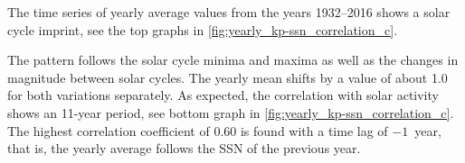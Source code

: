 The time series of yearly average \Kp{} values from the years 1932--2016 shows a solar cycle imprint, see the top graphs in \autoref{fig:yearly_kp-ssn_correlation_c}.
\begin{figure}
\end{figure}
The \Kp{} pattern follows the solar cycle minima and maxima as well as the changes in magnitude between solar cycles. The yearly mean \Kp{} shifts by a value of about \num{1.0} for both variations separately. As expected, the correlation with solar activity shows an 11-year period, see bottom graph in \autoref{fig:yearly_kp-ssn_correlation_c}. The highest correlation coefficient of \num{0.60} is found with a time lag of $-1$~year, that is, the yearly average \Kp{} follows the SSN of the previous year.

